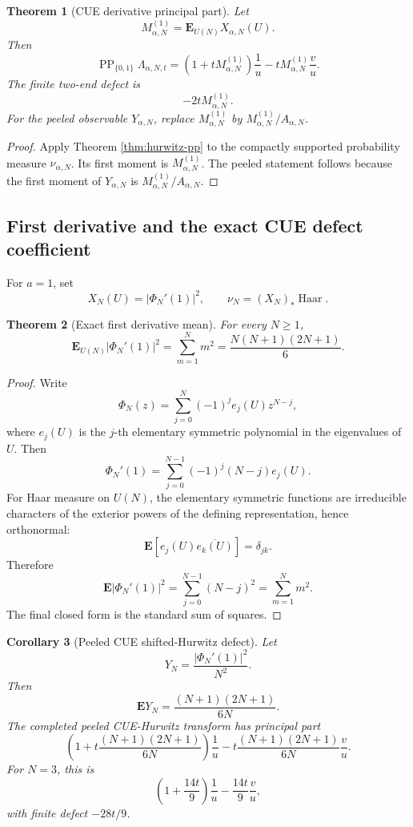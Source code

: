\documentclass[11pt]{article}
\newcommand{\PP}{\operatorname{PP}}
\newcommand{\Haar}{\operatorname{Haar}}
\theoremstyle{plain}
\newtheorem{theorem}{Theorem}[section]
\newtheorem{corollary}[theorem]{Corollary}
\theoremstyle{definition}
\begin{document}
\begin{theorem}[CUE derivative principal part]\label{thm:cue-pp}
Let
\[
   M_{\alpha,N}^{(1)}=\mathbf E_{U(N)}X_{\alpha,N}(U).
\]
Then
\[
   \PP_{\{0,1\}}\Lambda_{\alpha,N,t}
   =\left(1+tM_{\alpha,N}^{(1)}\right)\frac1u
   -tM_{\alpha,N}^{(1)}\frac vu.
\]
The finite two-end defect is
\[
   -2tM_{\alpha,N}^{(1)}.
\]
For the peeled observable \(Y_{\alpha,N}\), replace \(M_{\alpha,N}^{(1)}\) by \(M_{\alpha,N}^{(1)}/A_{\alpha,N}\).
\end{theorem}

\begin{proof}
Apply Theorem \ref{thm:hurwitz-pp} to the compactly supported probability measure \(\nu_{\alpha,N}\).  Its first moment is \(M_{\alpha,N}^{(1)}\).  The peeled statement follows because the first moment of \(Y_{\alpha,N}\) is \(M_{\alpha,N}^{(1)}/A_{\alpha,N}\).
\end{proof}

\subsection{First derivative and the exact CUE defect coefficient}

For \(a=1\), set
\[
   X_N(U)=|\Phi_N'(1)|^2,
   \qquad
   \nu_N=(X_N)_*\Haar.
\]

\begin{theorem}[Exact first derivative mean]\label{thm:first-deriv-mean}
For every \(N\ge1\),
\[
   \mathbf E_{U(N)}|\Phi_N'(1)|^2
   =\sum_{m=1}^N m^2
   =\frac{N(N+1)(2N+1)}6.
\]
\end{theorem}

\begin{proof}
Write
\[
   \Phi_N(z)=\sum_{j=0}^N(-1)^j e_j(U)z^{N-j},
\]
where \(e_j(U)\) is the \(j\)-th elementary symmetric polynomial in the eigenvalues of \(U\).  Then
\[
   \Phi_N'(1)=\sum_{j=0}^{N-1}(-1)^j(N-j)e_j(U).
\]
For Haar measure on \(U(N)\), the elementary symmetric functions are irreducible characters of the exterior powers of the defining representation, hence orthonormal:
\[
   \mathbf E[e_j(U)\overline{e_k(U)}]=\delta_{jk}.
\]
Therefore
\[
   \mathbf E|\Phi_N'(1)|^2=\sum_{j=0}^{N-1}(N-j)^2=\sum_{m=1}^Nm^2.
\]
The final closed form is the standard sum of squares.
\end{proof}

\begin{corollary}[Peeled CUE shifted-Hurwitz defect]\label{cor:cue-peeled-defect}
Let
\[
   Y_N=\frac{|\Phi_N'(1)|^2}{N^2}.
\]
Then
\[
   \mathbf E Y_N=\frac{(N+1)(2N+1)}{6N}.
\]
The completed peeled CUE-Hurwitz transform has principal part
\[
   \left(1+t\frac{(N+1)(2N+1)}{6N}\right)\frac1u
   -t\frac{(N+1)(2N+1)}{6N}\frac vu.
\]
For \(N=3\), this is
\[
   \left(1+\frac{14t}{9}\right)\frac1u-\frac{14t}{9}\frac vu,
\]
with finite defect \(-28t/9\).
\end{corollary}
\end{document}
